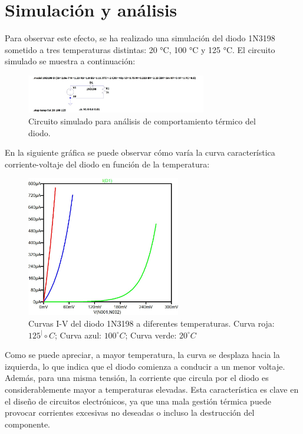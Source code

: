 \documentclass[chaptersright]{informeutn}
\begin{document}
  \section{Simulación y análisis}
  
    Para observar este efecto, se ha realizado una simulación del diodo 1N3198 sometido a tres temperaturas distintas: 
    20 °C, 100 °C y 125 °C. El circuito simulado se muestra a continuación:
    
    \begin{figure}[H]
        \centering
        \includegraphics[width=0.7\textwidth]{pictures/comparacion_temperatura_circuito.jpeg}
        \caption{Circuito simulado para análisis de comportamiento térmico del diodo.}
    \end{figure}
    
    En la siguiente gráfica se puede observar cómo varía la curva característica corriente-voltaje del diodo en función de
    la temperatura:
    
    \begin{figure}[H]
        \centering
        \includegraphics[width=0.6\textwidth]{pictures/comparacion_temperatura_grafico.jpeg}
        \caption{Curvas I-V del diodo 1N3198 a diferentes temperaturas. Curva roja: $125^|\circ C$; Curva azul:
            $100^\circ C$; Curva verde: $20^\circ C$}
    \end{figure}

    
    Como se puede apreciar, a mayor temperatura, la curva se desplaza hacia la izquierda, lo que indica que el diodo
    comienza a conducir a un menor voltaje. Además, para una misma tensión, la corriente que circula por el diodo es
    considerablemente mayor a temperaturas elevadas. Esta característica es clave en el diseño de circuitos electrónicos, 
    ya que una mala gestión térmica puede provocar corrientes excesivas no deseadas o incluso la destrucción del componente.
\end{document}
